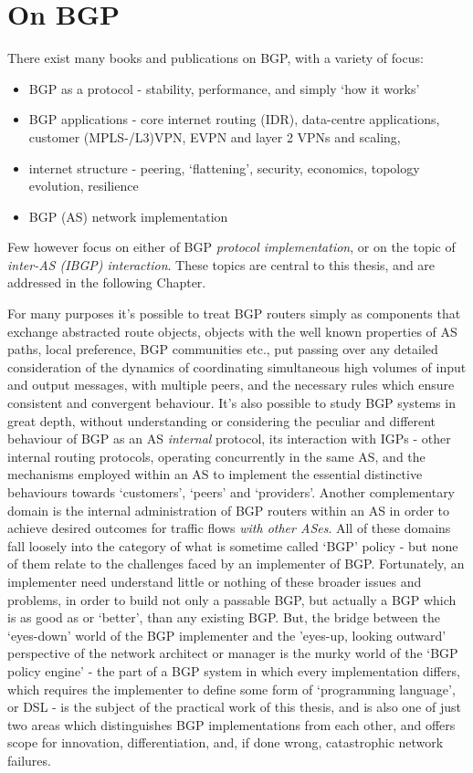 \chapter{On BGP}
There exist many books and publications on BGP, with a variety of focus:
\begin{itemize}
	\item BGP as a protocol - stability, performance, and simply `how it works'
	\item BGP applications - core internet routing (IDR), data-centre
	      applications, customer (MPLS-/L3)VPN, EVPN and layer 2 VPNs and
	      scaling,
	\item internet structure - peering, `flattening', security, economics,
	      topology evolution, resilience
	\item BGP (AS) network implementation
\end{itemize}

Few however focus on either of BGP \textit{protocol implementation}, or on the topic of \textit{inter-AS (IBGP) interaction}. These topics are central to this thesis, and are addressed in the following Chapter.



For many purposes it's possible to treat BGP routers simply as components that
exchange abstracted route objects, objects with the well known properties of AS
paths, local preference, BGP communities etc., put passing over any detailed
consideration of the dynamics of coordinating simultaneous high volumes of
input and output messages, with multiple peers, and the necessary rules which
ensure consistent and convergent behaviour.
It's also possible to study BGP systems in great depth,
without understanding or considering the peculiar and different behaviour of
BGP as an AS \textit{internal} protocol,
its interaction with IGPs - other internal routing protocols,
operating concurrently in the same AS,
and the mechanisms employed within an AS to implement the essential distinctive
behaviours towards `customers', `peers' and `providers'.    Another
complementary domain is the internal administration of BGP routers within an AS
in order to achieve desired outcomes for traffic flows \textit{with other ASes}.
All of these domains fall loosely into the category of what is
sometime
called `BGP' policy - but none of them relate to the challenges faced by an
implementer of BGP.  Fortunately, an implementer need understand little or nothing of
these broader issues and problems, in order to build not only a passable BGP, but
actually a BGP which is as good as or `better', than any existing BGP.
But, the bridge between the `eyes-down' world of the BGP implementer and the
'eyes-up, looking outward' perspective of the network architect or manager is
the murky world of the `BGP policy engine' - the part of a BGP system in which
every implementation differs, which requires the implementer to define some
form of `programming language', or DSL - is the subject of the practical work
of this thesis, and is also one of just two  areas which distinguishes BGP
implementations from each other, and offers scope for innovation,
differentiation, and, if done wrong, catastrophic network failures.

